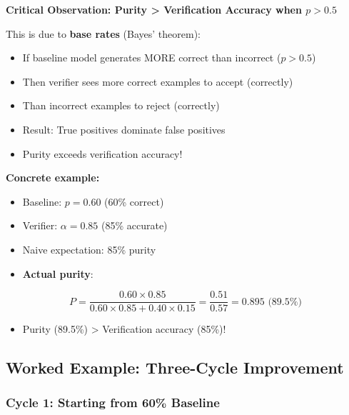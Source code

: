 \documentclass[12pt,a4paper]{article}
\theoremstyle{definition}
\begin{document}
\begin{keyinsightbox}
\textbf{Critical Observation: Purity > Verification Accuracy when $p > 0.5$}

This is due to \textbf{base rates} (Bayes' theorem):
\begin{itemize}
    \item If baseline model generates MORE correct than incorrect ($p > 0.5$)
    \item Then verifier sees more correct examples to accept (correctly)
    \item Than incorrect examples to reject (correctly)
    \item Result: True positives dominate false positives
    \item Purity exceeds verification accuracy!
\end{itemize}

\textbf{Concrete example:}
\begin{itemize}
    \item Baseline: $p = 0.60$ (60\% correct)
    \item Verifier: $\alpha = 0.85$ (85\% accurate)
    \item Naive expectation: 85\% purity
    \item \textbf{Actual purity}: 
\end{itemize}
\begin{equation}
P = \frac{0.60 \times 0.85}{0.60 \times 0.85 + 0.40 \times 0.15} = \frac{0.51}{0.57} = 0.895 \text{ (89.5\%)}
\end{equation}
\begin{itemize}
    \item Purity (89.5\%) > Verification accuracy (85\%)!
\end{itemize}
\end{keyinsightbox}

\subsection{Worked Example: Three-Cycle Improvement}

\subsubsection{Cycle 1: Starting from 60\% Baseline}
\end{document}
